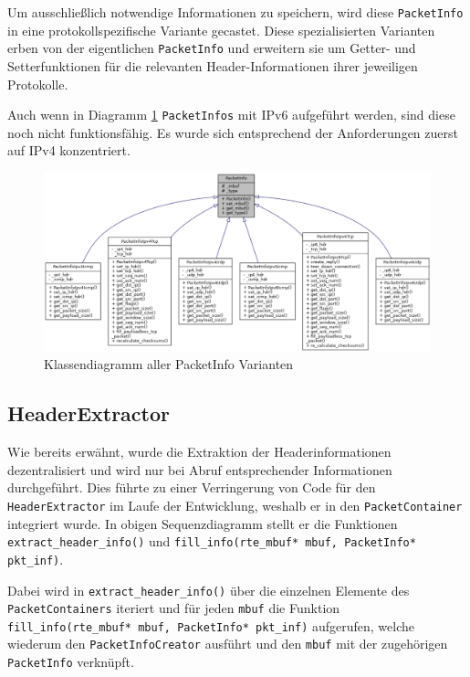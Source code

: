\documentclass[../review_2.tex]{subfiles}
\begin{document}
Um ausschließlich notwendige Informationen zu speichern, wird diese \texttt{PacketInfo} in eine protokollspezifische Variante gecastet. Diese spezialisierten Varianten erben von der eigentlichen \texttt{PacketInfo} und erweitern sie um Getter- und Setterfunktionen für die relevanten Header-Informationen ihrer jeweiligen Protokolle.

Auch wenn in Diagramm \ref{Klassendiagramm_PacketInfo} \texttt{PacketInfos} mit IPv6 aufgeführt werden, sind diese noch nicht funktionsfähig. Es wurde sich entsprechend der Anforderungen zuerst auf IPv4 konzentriert.

\begin{figure}
	\centering
	\includegraphics[width=\linewidth]{img/PacketInfoInheritance.pdf}
	\caption{Klassendiagramm aller PacketInfo Varianten}
	\label{Klassendiagramm_PacketInfo}
\end{figure}

\subsection{HeaderExtractor}
Wie bereits erwähnt, wurde die Extraktion der Headerinformationen dezentralisiert und wird nur bei Abruf entsprechender Informationen durchgeführt. Dies führte zu einer Verringerung von Code für den \texttt{HeaderExtractor} im Laufe der Entwicklung, weshalb er in den \texttt{PacketContainer} integriert wurde. In obigen Sequenzdiagramm stellt er die Funktionen \texttt{extract\_header\_info()} und \texttt{fill\_info(rte\_mbuf* mbuf, PacketInfo* pkt\_inf)}.

Dabei wird in \texttt{extract\_header\_info()} über die einzelnen Elemente des \texttt{PacketContainers} iteriert und für jeden \texttt{mbuf} die Funktion \texttt{fill\_info(rte\_mbuf* mbuf, PacketInfo* pkt\_inf)} aufgerufen, welche wiederum den \texttt{PacketInfoCreator} ausführt und den \texttt{mbuf} mit der zugehörigen \texttt{PacketInfo} verknüpft.
\end{document}
